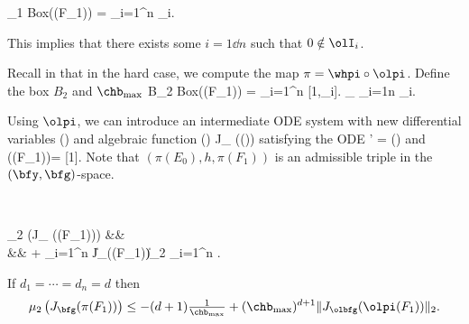 			\0\nin \olF_1 \as Box(\bff(F_1)) = \prod_{i=1}^n \olI_i.
		\eeql  

	This implies that there exists some $i =1\dd n$ such that
	$0 \notin \olI_i$. 

	Recall in 
	that in the hard case, we compute the
	map $\pi = \whpi \circ \olpi$.
	Define the box $B_2$ and $\chb_{\max}$
			B_2 \as Box(\olpi(F_1)) = \prod_{i=1}^n [1,\chb_i].
					\quad
              \chb_{\max} \as \max_{i=1\dd n} \chb_i.
		\eeql

	Using $\olpi$, we can introduce an intermediate ODE system
		with new differential variables
					\olbfy \as \olpi(\bfx)
			\eeql
		and algebraic function
				\olbfg(\olbfy) \as J_{\olpi} \Bigcdot
							\bff(\olpi\inv(\olbfy))
			\eeql
		satisfying the ODE
					\olbfy' = \olbfg(\olbfy)
				\eeql
		and
			\beql{olbfg}
				\olbfg(\olpi(F_1))\ge \1= [1\dd 1].
			\eeql
	Note that $(\pi(E_0), h, \pi(F_1))$ is
	an admissible triple in the $(\bfy,\bfg)$-space.



	 \ \\
	\benum[(a)]
	\item
		\beqarrys
	 	\mu_2 \big(J_{\bfg} (\pi(F_1))\big)
			&\le&
 			\max{}\\
		&&
			+ \max_{i=1}^n  
        		\cdot
					\|J_{\olbfg}(\olpi(F_1))\|_2
				\cdot
				\max_{i=1}^n .
		\eeqarrys
	\item If $d_1=\cdots=d_n=d$ then
			$$\mu_2 \left(J_{\bfg} (\pi(F_1))\right)
				\le
					-(d+1)\tfrac{1}{\chb_{\max}}
						+(\chb_{\max})^{d+1}
								\|J_{\olbfg}(\olpi(F_1))\|_2.
			$$
	\eenum
	\ethml

